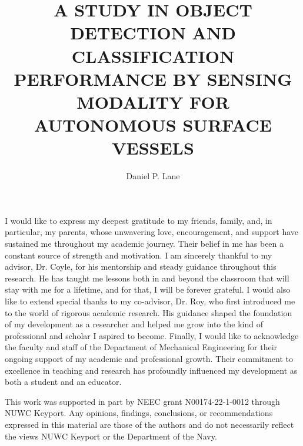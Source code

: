 \documentclass{erauthesis}
\title{A STUDY IN OBJECT DETECTION AND CLASSIFICATION PERFORMANCE BY SENSING MODALITY FOR AUTONOMOUS SURFACE VESSELS} %
\author{Daniel P. Lane}
\begin{document}
\frontmatter

\maketitle

\makesignature
\makeatletter 


\begin{acknowledgements}
I would like to express my deepest gratitude to my friends, family, and, in particular, my parents, whose unwavering love, encouragement, and support have sustained me throughout my academic journey. Their belief in me has been a constant source of strength and motivation.
I am sincerely thankful to my advisor, Dr. Coyle, for his mentorship and steady guidance throughout this research. He has taught me lessons both in and beyond the classroom that will stay with me for a lifetime, and for that, I will be forever grateful.
I would also like to extend special thanks to my co-advisor, Dr. Roy, who first introduced me to the world of rigorous academic research. His guidance shaped the foundation of my development as a researcher and helped me grow into the kind of professional and scholar I aspired to become.
Finally, I would like to acknowledge the faculty and staff of the Department of Mechanical Engineering for their ongoing support of my academic and professional growth. 
Their commitment to excellence in teaching and research has profoundly influenced my development as both a student and an educator.

\vspace{3mm}

This work was supported in part by NEEC grant N00174-22-1-0012 through NUWC Keyport.
Any opinions, findings, conclusions, or recommendations expressed in this material are those of the authors and do not necessarily reflect the views NUWC Keyport or
the Department of the Navy.
\end{acknowledgements}
\end{document}
